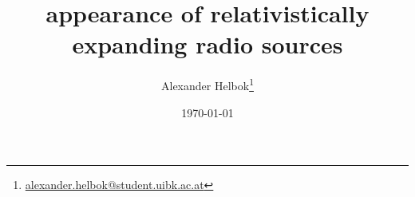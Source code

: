 \thispagestyle{empty}
\titlehead{\texttt{[image: logo.jpg]}}
\title{appearance of relativistically expanding radio sources}
\author{Alexander Helbok\thanks{\href{alexander.helbok@student.uibk.ac.at}{alexander.helbok@student.uibk.ac.at}}}
\date{\today}
\maketitle
\vfill 